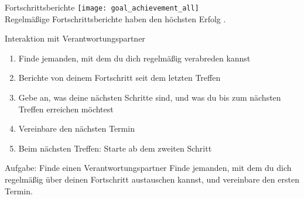 \begin{frame}[c]{Fortschrittsberichte}
    \small
    \texttt{[image: goal\_achievement\_all]} \\
    Regelmäßige Fortschrittsberichte haben den höchsten Erfolg \cite{better-goals-2}.
\end{frame}


\begin{frame}[c]{Interaktion mit Verantwortungspartner}
    \begin{enumerate}[<+(1)->]
        \item Finde jemanden, mit dem du dich regelmäßig verabreden kannst
        \item Berichte von deinem Fortschritt seit dem letzten Treffen
        \item Gebe an, was deine nächsten Schritte sind, und was du bis zum nächsten Treffen erreichen möchtest
        \item Vereinbare den nächsten Termin
        \item Beim nächsten Treffen: Starte ab dem zweiten Schritt
    \end{enumerate}
\end{frame}


\begin{frame}[c]
    \begin{block}{Aufgabe: Finde einen Verantwortungspartner}
        Finde jemanden, mit dem du dich regelmäßig über deinen
        Fortschritt austauschen kannst, und vereinbare den ersten Termin.
    \end{block}
\end{frame}

